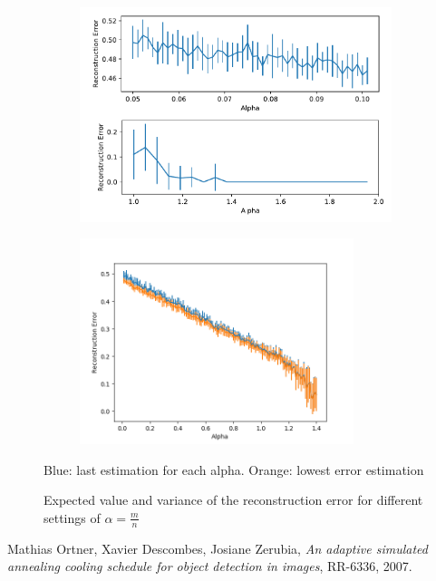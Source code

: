 \documentclass{scrartcl}
\begin{document}
\begin{figure}[h]
    \centering
    \begin{subfigure}{0.49\textwidth}
        \includegraphics[width=\textwidth]{critical_values.pdf}
    \end{subfigure}
    \begin{subfigure}{0.49\textwidth}
    \includegraphics[height=6cm]{alpha_both.png}
    \end{subfigure}
    \caption{Expected value and variance of the reconstruction error for different settings of $\alpha = \frac{m}{n}$} Blue: last estimation for each alpha. Orange: lowest error estimation
    \label{fig:alpha_both}
\end{figure}


\begin{thebibliography}{9}

  Mathias Ortner, Xavier Descombes, Josiane Zerubia,
  \textit{An adaptive simulated annealing cooling schedule for object detection in images},
  RR-6336,
  2007.

\end{thebibliography}
\end{document}
